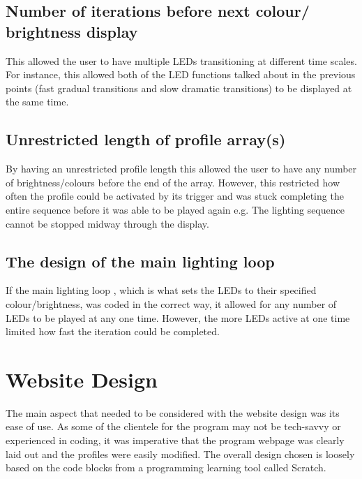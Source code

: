 \subsection {Number of iterations before next colour/ brightness display}
This allowed the user to have multiple LEDs transitioning at different time scales. For instance, this allowed both of the LED functions talked about in the previous points (fast gradual transitions and slow dramatic transitions) to be displayed at the same time. 

\subsection {Unrestricted length of profile array(s)} 
By having an unrestricted profile length this allowed the user to have any number of brightness/colours before the end of the array. However, this restricted how often the profile could be activated by its trigger and was stuck completing the entire sequence before it was able to be played again e.g. The lighting sequence cannot be stopped midway through the display.

\subsection{The design of the main lighting loop}
If the main lighting loop , which is what sets the LEDs to their specified colour/brightness, was coded in the correct way, it allowed for any number of LEDs to be played at any one time. However, the more LEDs active at one time limited how fast the iteration could be completed.

\section{Website Design}
The main aspect that needed to be considered with the website design was its ease of use. As some of the clientele for the program may not be tech-savvy or experienced in coding, it was imperative that the program webpage was clearly laid out and the profiles were easily modified. The overall design chosen is loosely based on the code blocks from a programming learning tool called Scratch.

